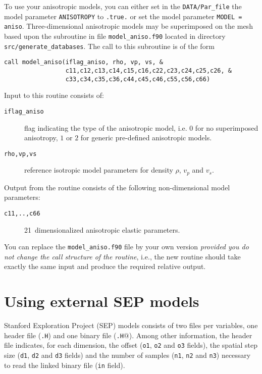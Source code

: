 To use your anisotropic models, you can either set in the \texttt{DATA/Par\_file}
the model parameter \texttt{ANISOTROPY} to \texttt{.true.} or set
the model parameter \texttt{MODEL = aniso}. Three-dimensional anisotropic
models may be superimposed on the mesh based upon the subroutine in
file \texttt{model\_aniso.f90} located in directory \texttt{src/generate\_databases}.
The call to this subroutine is of the form
\begin{verbatim}
call model_aniso(iflag_aniso, rho, vp, vs, &
                 c11,c12,c13,c14,c15,c16,c22,c23,c24,c25,c26, &
                 c33,c34,c35,c36,c44,c45,c46,c55,c56,c66)
\end{verbatim}
Input to this routine consists of:
\begin{description}
\item [{\texttt{iflag\_aniso}}] flag indicating the type of the anisotropic
model, i.e. $0$ for no superimposed anisotropy, $1$ or $2$ for
generic pre-defined anisotropic models.
\item [{\texttt{rho,vp,vs}}] reference isotropic model parameters for density
$\rho$, $v_{p}$ and $v_{s}$.
\end{description}
Output from the routine consists of the following non-dimensional
model parameters:
\begin{description}
\item [{\texttt{c11,..,c66}}] 21~dimensionalized
anisotropic elastic parameters.
\end{description}
You can replace the \texttt{model\_aniso.f90} file by your own version
\textit{provided you do not change the call structure of the routine},
i.e., the new routine should take exactly the same input and produce
the required relative output.



\section{Using external SEP models}\label{sec:Using-SEP}

Stanford Exploration Project (SEP) models consists of two files per variables, one header file (\texttt{.H})
and one binary file (\texttt{.H$@$}).
Among other information, the header file indicates, for each dimension,
the offset (\texttt{o1}, \texttt{o2} and \texttt{o3} fields),
the spatial step size (\texttt{d1}, \texttt{d2} and \texttt{d3} fields)
and the number of samples (\texttt{n1}, \texttt{n2} and \texttt{n3}) necessary to read
the linked binary file (\texttt{in} field).\newline

